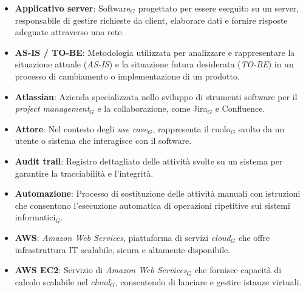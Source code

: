 \begin{itemize}
    \item \textbf{Applicativo server}: Software$_G$ progettato per essere eseguito su un server, responsabile di gestire richieste da client, elaborare dati e fornire risposte adeguate attraverso una rete.
    \item \textbf{AS-IS / TO-BE}: Metodologia utilizzata per analizzare e rappresentare la situazione attuale (\textit{AS-IS}) e la situazione futura desiderata (\textit{TO-BE}) in un processo di cambiamento o implementazione di un prodotto.
    \item \textbf{Atlassian}: Azienda specializzata nello sviluppo di strumenti software per il \textit{project management}$_G$ e la collaborazione, come Jira$_G$ e Confluence.
    \item \textbf{Attore}: Nel contesto degli \textit{use case}$_G$, rappresenta il ruolo$_G$ svolto da un utente o sistema che interagisce con il software.
    \item \textbf{Audit trail}: Registro dettagliato delle attività svolte su un sistema per garantire la tracciabilità e l’integrità.
    \item \textbf{Automazione}: Processo di sostituzione delle attività manuali con istruzioni che consentono l'esecuzione automatica di operazioni ripetitive sui sistemi informatici$_G$.
    \item \textbf{AWS}: \textit{Amazon Web Services}, piattaforma di servizi \textit{cloud}$_G$ che offre infrastruttura IT scalabile, sicura e altamente disponibile.
    \item \textbf{AWS EC2}: Servizio di \textit{Amazon Web Services}$_G$ che fornisce capacità di calcolo scalabile nel \textit{cloud}$_G$, consentendo di lanciare e gestire istanze virtuali.
\end{itemize}
